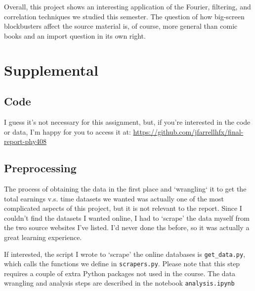 \documentclass[12pt]{article}
\begin{document}
Overall, this project shows an interesting application of the Fourier, filtering, and correlation techniques we studied this semester.  The question of how big-screen blockbusters affect the source material is, of course, more general than comic books and an import question in its own right.

\pagebreak


\pagebreak
\appendix



\section{Supplemental}
\subsection{Code}
I guess it's not necessary for this assignment, but, if you're interested in the code or data, I'm happy for you to access it at: \hyperlink{https://github.com/jfarrellhfx/final-report-phy408}{https://github.com/jfarrellhfx/final-report-phy408}

\subsection{Preprocessing}
The process of obtaining the data in the first place and `wrangling` it to get the total earnings v.s. time datasets we wanted was actually one of the most complicated aspects of this project, but it is not relevant to the report.  Since I couldn't find the datasets I wanted online, I had to `scrape' the data myself from the two source websites I've listed.  I'd never done ths before, so it was actually a great learning experience.

 If interested, the script I wrote to `scrape' the online databases is \texttt{get\_data.py}, which calls the functions we define in \texttt{scrapers.py}.  Please note that this step requires a couple of extra Python packages not used in the course. The data wrangling and analysis steps are described in the notebook \texttt{analysis.ipynb}
\end{document}
